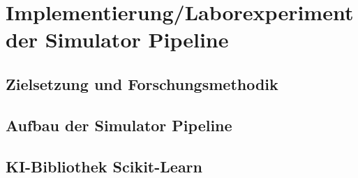 \chapter{Implementierung/Laborexperiment der Simulator Pipeline}
\section{Zielsetzung und Forschungsmethodik}
\section{Aufbau der Simulator Pipeline}
\section{KI-Bibliothek Scikit-Learn}

